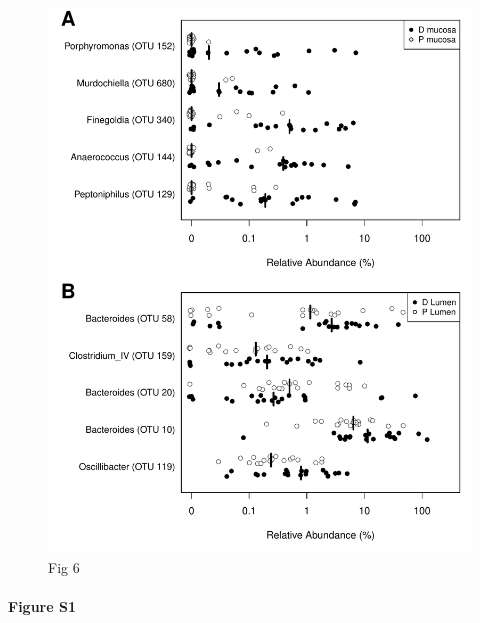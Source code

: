 \documentclass[12pt,]{article}
\let\oldparagraph\paragraph
\renewcommand{\paragraph}[1]{\oldparagraph{#1}\mbox{}}
\begin{document}
\begin{figure}[htbp]
\centering
\includegraphics{../submission/figure_6.pdf}
\caption{Fig 6}
\end{figure}

\newpage

\paragraph{Figure S1}\label{figure-s1}
\end{document}
